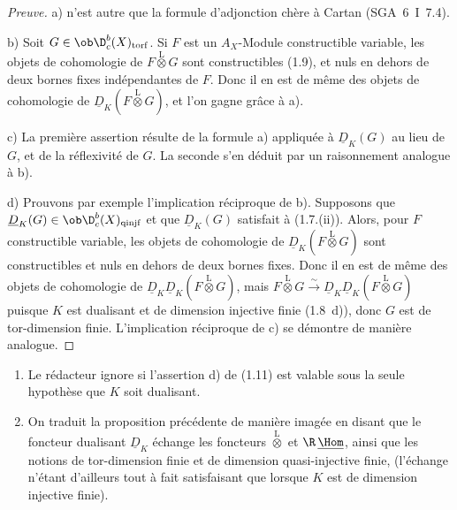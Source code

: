 \begin{proof}[Preuve]
a) n'est autre que la formule d'adjonction chère à Cartan (SGA~6~I~7.4).

b) Soit $G \in \ob \D_c^{b}(X)_{\mathrm{torf}}$. Si $F$ est un $A_X$-Module constructible variable, les objets de cohomologie de $F \mathop{\otimes}\limits^{\mathrm{L}} G$ sont constructibles (1.9), et nuls en dehors de deux bornes fixes indépendantes de $F$. Donc il en est de même des objets de cohomologie de $\underline{D}_K(F \mathop{\otimes}\limits^{\mathrm{L}} G)$, et l'on gagne grâce à a).

c) La première assertion résulte de la formule a) appliquée à $\underline{D}_K(G)$ au lieu de $G$, et de la réflexivité de $G$. La seconde s'en déduit par un raisonnement analogue à b).

d) Prouvons par exemple l'implication réciproque de b). Supposons que $\underline{D}_K(G) \in \ob \D_c^{b}(X)_{\mathrm{qinjf}}$ et que $\underline{D}_K(G)$ satisfait à (1.7.(ii)). Alors, pour $F$ constructible variable, les objets de cohomologie de $\underline{D}_K(F \mathop{\otimes}\limits^{\mathrm{L}} G)$ sont constructibles et nuls en dehors de deux bornes fixes. Donc il en est de même des objets de cohomologie de $\underline{D}_K \underline{D}_K(F \mathop{\otimes}\limits^{\mathrm{L}} G)$, mais $F \mathop{\otimes}\limits^{\mathrm{L}} G \xrightarrow{\sim} \underline{D}_K \underline{D}_K(F \mathop{\otimes}\limits^{\mathrm{L}} G)$ puisque $K$ est dualisant et de dimension injective finie (1.8~d)), donc $G$ est de tor-dimension finie. L'implication réciproque de c) se démontre de manière analogue.
\end{proof}

\begin{remark}
\begin{enumerate}
\item[a)] Le rédacteur ignore si l'assertion d) de (1.11) est valable sous la seule hypothèse que $K$ soit dualisant.
\item[b)] On traduit la proposition précédente de manière imagée en disant que le foncteur dualisant $\underline{D}_K$ échange les foncteurs $\mathop{\otimes}\limits^{\mathrm{L}}$ et $\R\,\underline{\Hom}$, ainsi que les notions de tor-dimension finie et de dimension quasi-injective finie, (l'échange n'étant d'ailleurs tout à fait satisfaisant que lorsque $K$ est de dimension injective finie).
\end{enumerate}
\end{remark}

